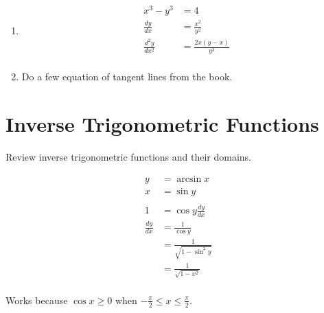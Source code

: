 \documentclass[letterpaper, landscape]{exam}
\begin{document}
\begin{enumerate}
    \item 
      \begin{align*}
        x^3 - y^3         & = 4 \\
        \frac{dy}{dx}     & = \frac{x^2}{y^2} \\
        \frac{d^2y}{dx^2} & = \frac{2 x (y-x)}{y^3} \\
      \end{align*}
      
    \item Do a few equation of tangent lines from the book.
  \end{enumerate}

  \section{Inverse Trigonometric Functions} %
  
  Review inverse trigonometric functions and their domains.

  \begin{align*}
    y             & = \arcsin x \\
    x             & = \sin y \\
    \\
    1             & = \cos y \frac{dy}{dx} \\
    \frac{dy}{dx} & = \frac{1}{\cos y} \\
                  & = \frac{1}{\sqrt{1 - \sin^2 y}} \\
                  & = \frac{1}{\sqrt{1 - x^2}} \\
  \end{align*}

  Works because $\cos x \geq 0$ when $-\frac{\pi}{2} \leq x \leq \frac{\pi}{2}$.
\end{document}
